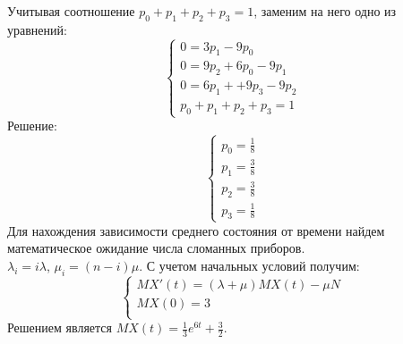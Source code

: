 \documentclass [a4paper,12pt]{article}
\begin{document}
Учитывая соотношение $p_0 + p_1 + p_2 + p_3 = 1$, заменим на него одно из уравнений:
\begin{equation*}
\begin{cases}
0 = 3p_1 - 9p_0
\\
0 = 9p_2 + 6p_0 - 9p_1
\\
0 = 6p_1 + + 9p_3 - 9p_2
\\
p_0 + p_1 + p_2 + p_3 = 1
\end{cases}
\end{equation*}
Решение:
\begin{equation*}
\begin{cases}
p_0 = \frac{1}{8}
\\
p_1 = \frac{3}{8}
\\
p_2 = \frac{3}{8}
\\
p_3 = \frac{1}{8}
\end{cases}
\end{equation*}
Для нахождения зависимости среднего состояния от времени найдем математическое ожидание числа сломанных приборов.\\
$\lambda_i = i{\lambda}$, $\mu_i = (n-i){\mu}$. С учетом начальных условий получим:\\
\begin{equation*}
\begin{cases}
MX'(t) = (\lambda + \mu)MX(t) - {\mu}N
\\
MX(0) = 3
\\
\end{cases}
\end{equation*}
Решением является $MX(t) = \frac{1}{3}e^{6t}+\frac{3}{2}$.
\end{document}
